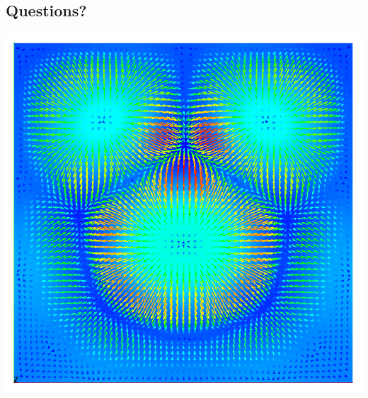 \documentclass[compress,12pt]{beamer}
\begin{document}
\subsection{Questions?}
\begin{frame}%
  \centerline{\includegraphics[height=.8\textheight]{figures/smiley2}}
\end{frame}
\end{document}
